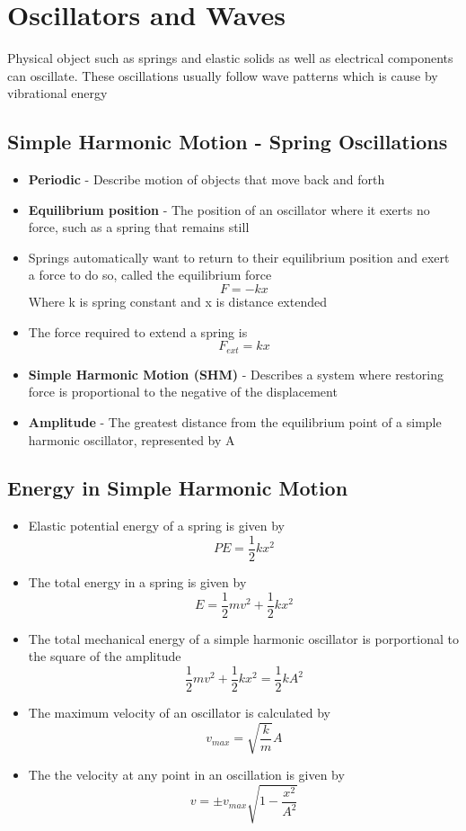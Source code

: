 \section{Oscillators and Waves}
Physical object such as springs and  elastic solids as well as electrical components can oscillate. These oscillations usually follow wave patterns which is cause by vibrational energy

\subsection{Simple Harmonic Motion - Spring Oscillations}
\begin{itemize}
    \item \textbf{Periodic} - Describe motion of objects that move back and forth
    \item \textbf{Equilibrium position} - The position of an oscillator where it exerts no force, such as a spring that remains still
    \item Springs automatically want to return to their equilibrium position and exert a force to do so, called the equilibrium force \[F=-kx\] Where k is spring constant and x is distance extended
    \item The force required to extend a spring is \[F_{ext}=kx\]
    \item \textbf{Simple Harmonic Motion (SHM)} - Describes a system where restoring force is proportional to the negative of the displacement
    \item \textbf{Amplitude} - The greatest distance from the equilibrium point of a simple harmonic oscillator, represented by A
\end{itemize}

\subsection{Energy in Simple Harmonic Motion}
\begin{itemize}
    \item Elastic potential energy of a spring is given by \[PE=\frac{1}{2}kx^2\]
    \item The total energy in a spring is given by \[E=\frac{1}{2}mv^2+\frac{1}{2}kx^2\]
    \item The total mechanical energy of a simple harmonic oscillator is porportional to the square of the amplitude \[\frac{1}{2}mv^2+\frac{1}{2}kx^2=\frac{1}{2}kA^2\]
    \item The maximum velocity of an oscillator is calculated by \[v_{max}=\sqrt{\frac{k}{m}}A\]
    \item The the velocity at any point in an oscillation is given by \[v=\pm v_{max}\sqrt{1-\frac{x^2}{A^2}}\]
\end{itemize}

